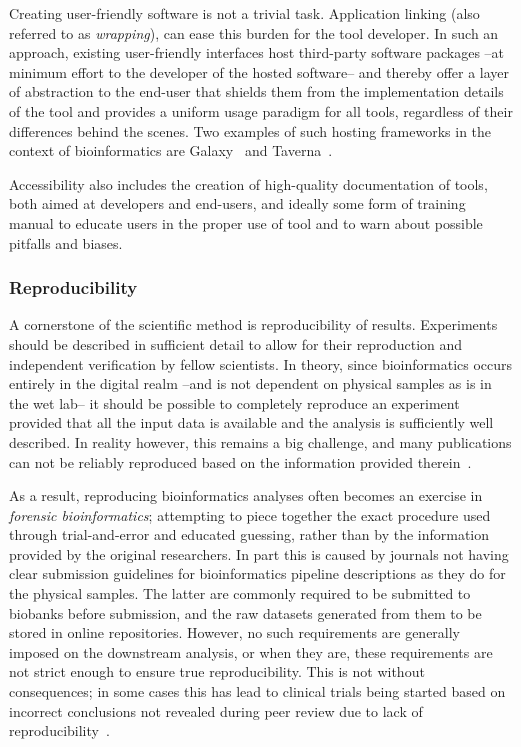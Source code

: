 \begin{justify}
Creating user-friendly software is not a trivial task. Application linking (also referred to as \emph{wrapping}), can ease this burden for the tool developer. In such an approach, existing user-friendly interfaces host third-party software packages --at minimum effort to the developer of the hosted software-- and thereby offer a layer of abstraction to the end-user that shields them from the implementation details of the tool and provides a uniform usage paradigm for all tools, regardless of their differences behind the scenes. Two examples of such hosting frameworks in the context of bioinformatics are Galaxy~\cite{giardine2005galaxy,goecks2010galaxy} and Taverna~\cite{oinn2004taverna}.

Accessibility also includes the creation of high-quality documentation of tools, both aimed at developers and end-users, and ideally some form of training manual to educate users in the proper use of tool and to warn about possible pitfalls and biases.

\subsubsection{Reproducibility}

A cornerstone of the scientific method is reproducibility of results. Experiments should be described in sufficient detail to allow for their reproduction and independent verification by fellow scientists. In theory, since bioinformatics occurs entirely in the digital realm --and is not dependent on physical samples as is in the wet lab-- it should be possible to completely reproduce an experiment provided that all the input data is available and the analysis is sufficiently well described. In reality however, this remains a big challenge, and many publications can not be reliably reproduced based on the information provided therein~\cite{baggerly2009reproducible,kim2018reproducibility}.

As a result, reproducing bioinformatics analyses often becomes an exercise in \textit{forensic bioinformatics}; attempting to piece together the exact procedure used through trial-and-error and educated guessing, rather than by the information provided by the original researchers. In part this is caused by journals not having clear submission guidelines for bioinformatics pipeline descriptions as they do for the physical samples. The latter are commonly required to be submitted to biobanks before submission, and the raw datasets generated from them to be stored in online repositories. However, no such requirements are generally imposed on the downstream analysis, or when they are, these requirements are not strict enough to ensure true reproducibility. This is not without consequences; in some cases this has lead to clinical trials being started based on incorrect conclusions not revealed during peer review due to lack of reproducibility~\cite{baggerly2009reproducible}.


\end{justify}
